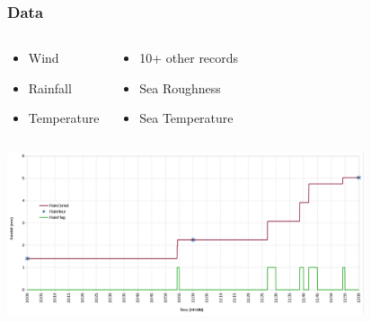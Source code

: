 \documentclass[serif,mathserif]{beamer}
\begin{document}
\begin{frame}
  \frametitle{Data}
\begin{columns}
\begin{center}
\begin{itemize}
 \item Wind
 \item Rainfall
 \item Temperature
\end{itemize}
\end{center}

\begin{center}
\begin{itemize}
 \item 10+ other records
 \item Sea Roughness 
 \item Sea Temperature
\end{itemize}
\end{center}
\end{columns}
\vspace{2mm}
\begin{center}
 \includegraphics[width=10.5cm]{rain_record}
\end{center}
\end{frame}

\end{document}
